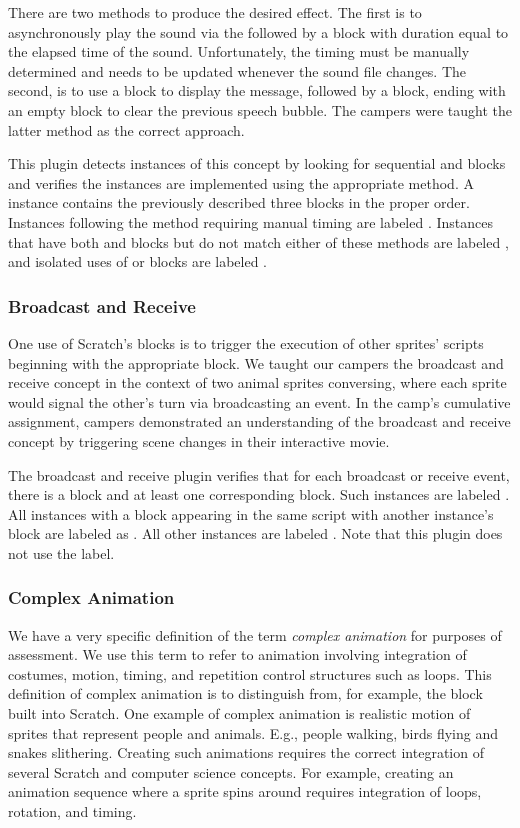 There are two methods to produce the desired effect.  The first is to
asynchronously play the sound via the \playsound{} followed by a \sayfor{}
block with duration equal to the elapsed time of the sound.  Unfortunately, the
timing must be manually determined and needs to be updated whenever the sound
file changes.  The second, is to use a \say{} block to display the message,
followed by a \playsounddone{} block, ending with an empty \say{} block to
clear the previous speech bubble. The campers were taught the latter method as
the correct approach.

This plugin detects instances of this concept by looking for sequential \say{}
and \playsound{} blocks and verifies the instances are implemented using the
appropriate method.  A \correct{} instance contains the previously described
three blocks in the proper order.  Instances following the method requiring
manual timing are labeled \semincor{}. Instances that have both \say{} and
\playsound{} blocks but do not match either of these methods are labeled
\incor{}, and isolated uses of \say{} or \playsound{} blocks are labeled
\incom{}.


\subsubsection{Broadcast and Receive}
One use of Scratch's \broadcast{} blocks is to trigger the execution of other
sprites' scripts beginning with the appropriate \receive{} block. We taught our
campers the broadcast and receive concept in the context of two animal sprites
conversing, where each sprite would signal the other's turn via broadcasting an
event. In the camp's cumulative assignment, campers demonstrated an
understanding of the broadcast and receive concept by triggering scene changes
in their interactive movie.

The broadcast and receive plugin verifies that for each broadcast or receive
event, there is a \broadcast{} block and at least one corresponding \receive{}
block. Such instances are labeled \correct{}. All instances with a \broadcast{}
block appearing in the same script with another instance's \broadcast{} block
are labeled as \semincor{}. All other instances are labeled \incom{}. Note that
this plugin does not use the \incor{} label.

\subsubsection{Complex Animation}
We have a very specific definition of the term \emph{complex animation} for
purposes of assessment.  We use this term to refer to animation involving
integration of costumes, motion, timing, and repetition control structures such
as loops. This definition of complex animation is to distinguish from, for
example, the \glideto{} block built into Scratch.  One example of complex
animation is realistic motion of sprites that represent people and
animals. E.g., people walking, birds flying and snakes slithering.  Creating
such animations requires the correct integration of several Scratch and
computer science concepts.  For example, creating an animation sequence where a
sprite spins around requires integration of loops, rotation, and timing.

